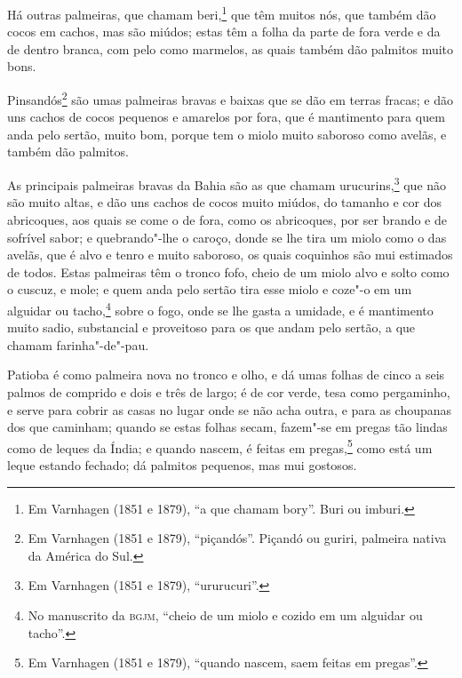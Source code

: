 \begin{linenumbers}
Há outras palmeiras, que chamam beri,\footnote{ Em Varnhagen (1851 e 1879), ``a que chamam
bory''. Buri ou imburi.} que têm muitos nós, que também dão cocos em cachos, mas são
miúdos; estas têm a folha da parte de fora verde e da de dentro branca, com pelo como
marmelos, as quais também dão palmitos muito bons.

Pinsandós\footnote{ Em Varnhagen (1851 e 1879), ``piçandós''. Piçandó ou guriri, palmeira
nativa da América do Sul.} são umas palmeiras bravas e baixas que se dão em terras fracas;
e dão uns cachos de cocos pequenos e amarelos por fora, que é mantimento para quem anda
pelo sertão, muito bom, porque tem o miolo muito saboroso como avelãs, e também dão
palmitos.

As principais palmeiras bravas da Bahia são as que chamam urucurins,\footnote{ Em
Varnhagen (1851 e 1879), ``ururucuri''.} que não são muito altas, e dão uns cachos de
cocos muito miúdos, do tamanho e cor dos abricoques, aos quais se come o de fora, como os
abricoques, por ser brando e de sofrível sabor; e quebrando"-lhe o caroço, donde se lhe
tira um miolo como o das avelãs, que é alvo e tenro e muito saboroso, os quais coquinhos
são mui estimados de todos. Estas palmeiras têm o tronco fofo, cheio de um miolo alvo e
solto como o cuscuz, e mole; e quem anda pelo sertão tira esse miolo e coze"-o em um
alguidar ou tacho,\footnote{ No manuscrito da \textsc{bgjm}, ``cheio de um miolo e cozido
em um alguidar ou tacho''.} sobre o fogo, onde se lhe gasta a umidade, e é mantimento
muito sadio, substancial e proveitoso para os que andam pelo sertão, a que chamam
farinha"-de"-pau.

Patioba é como palmeira nova no tronco e olho, e dá umas folhas de cinco a seis palmos de
comprido e dois e três de largo; é de cor verde, tesa como pergaminho, e serve para cobrir
as casas no lugar onde se não acha outra, e para as choupanas dos que caminham; quando se
estas folhas secam, fazem"-se em pregas tão lindas como de leques da Índia; e quando
nascem, é feitas em pregas,\footnote{ Em Varnhagen (1851 e 1879), ``quando nascem, saem
feitas em pregas''.} como está um leque estando fechado; dá palmitos pequenos, mas mui
gostosos.


\end{linenumbers}
